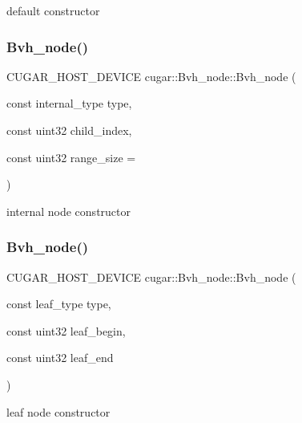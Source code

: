 default constructor \mbox{\label{structcugar_1_1_bvh__node_a01156ead9915a2849bc042fa57508345}} 
\subsubsection{\texorpdfstring{Bvh\+\_\+node()}{Bvh\_node()}\hspace{0.1cm}{\footnotesize\ttfamily [2/3]}}
{\footnotesize\ttfamily C\+U\+G\+A\+R\+\_\+\+H\+O\+S\+T\+\_\+\+D\+E\+V\+I\+CE cugar\+::\+Bvh\+\_\+node\+::\+Bvh\+\_\+node (\begin{DoxyParamCaption}\item[{const internal\+\_\+type}]{type,  }\item[{const uint32}]{child\+\_\+index,  }\item[{const uint32}]{range\+\_\+size = {} }\end{DoxyParamCaption})\hspace{0.3cm}{\ttfamily [inline]}}

internal node constructor \mbox{\label{structcugar_1_1_bvh__node_a0d997ffdc050ef2fd937a5805b3f06df}} 
\subsubsection{\texorpdfstring{Bvh\+\_\+node()}{Bvh\_node()}\hspace{0.1cm}{\footnotesize\ttfamily [3/3]}}
{\footnotesize\ttfamily C\+U\+G\+A\+R\+\_\+\+H\+O\+S\+T\+\_\+\+D\+E\+V\+I\+CE cugar\+::\+Bvh\+\_\+node\+::\+Bvh\+\_\+node (\begin{DoxyParamCaption}\item[{const leaf\+\_\+type}]{type,  }\item[{const uint32}]{leaf\+\_\+begin,  }\item[{const uint32}]{leaf\+\_\+end }\end{DoxyParamCaption})\hspace{0.3cm}{\ttfamily [inline]}}

leaf node constructor 

